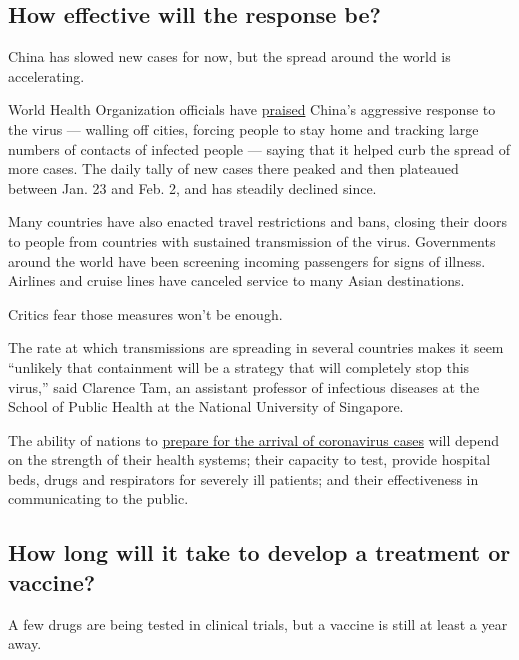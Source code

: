 \hypertarget{how-effective-will-the-response-be}{%
\subsection{How effective will the response
be?}\label{how-effective-will-the-response-be}}

China has slowed new cases for now, but the spread around the world is
accelerating.

World Health Organization officials have
\href{https://www.who.int/docs/default-source/coronaviruse/who-china-joint-mission-on-covid-19-final-report.pdf}{praised}
China's aggressive response to the virus --- walling off cities, forcing
people to stay home and tracking large numbers of contacts of infected
people --- saying that it helped curb the spread of more cases. The
daily tally of new cases there peaked and then plateaued between Jan. 23
and Feb. 2, and has steadily declined since.

Many countries have also enacted travel restrictions and bans, closing
their doors to people from countries with sustained transmission of the
virus. Governments around the world have been screening incoming
passengers for signs of illness. Airlines and cruise lines have canceled
service to many Asian destinations.

Critics fear those measures won't be enough.

The rate at which transmissions are spreading in several countries makes
it seem ``unlikely that containment will be a strategy that will
completely stop this virus,'' said Clarence Tam, an assistant professor
of infectious diseases at the School of Public Health at the National
University of Singapore.

The ability of nations to
\href{https://www.nytimes.com/2020/02/07/health/hospitals-coronavirus.html}{prepare
for the arrival of coronavirus cases} will depend on the strength of
their health systems; their capacity to test, provide hospital beds,
drugs and respirators for severely ill patients; and their effectiveness
in communicating to the public.

\hypertarget{how-long-will-it-take-to-develop-a-treatment-or-vaccine}{%
\subsection{How long will it take to develop a treatment or
vaccine?}\label{how-long-will-it-take-to-develop-a-treatment-or-vaccine}}

A few drugs are being tested in clinical trials, but a vaccine is still
at least a year away.

